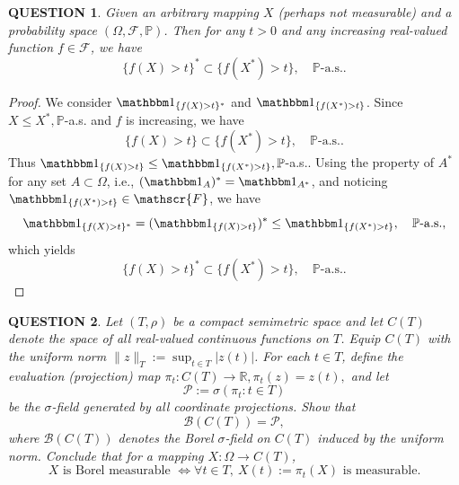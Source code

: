 \documentclass[12pt]{article}
\renewcommand{\(}{\left(}%
\renewcommand{\)}{\right)}%
\renewcommand{\[}{\left[}%
\renewcommand{\]}{\right]}%
\newcommand{\p}{\mathbb{P}}
\newcommand{\f}{\mathscr{F}}
\newtheorem{question}{QUESTION}[section]}
\newtheorem{proof}{Proof.}}
\begin{document}
\begin{question}
	Given an arbitrary mapping $X$ (perhaps not measurable) and a probability space $(\Omega,\f,\p)$. Then for any $t>0$ and any increasing real-valued function $f\in\f$, we have
	\begin{equation*}
		\{f(X)>t\}^*\subset \{f(X^*)>t\},\quad \p\text{-}\mathrm{a.s.}.
	\end{equation*}
\end{question}
\begin{proof}
	We consider $\mathbbm 1_{\{f(X)>t\}^*}$ and $\mathbbm 1_{\{f(X^*)>t\}}$. Since $X\leq X^*,\p$-a.s. and $f$ is increasing, we have 
	\begin{equation*}
		\{f(X)>t\}\subset \{f(X^*)>t\},\quad \p\text{-}\mathrm{a.s.}.
	\end{equation*}
	Thus $\mathbbm 1_{\{f(X)>t\}}\leq \mathbbm 1_{\{f(X^*)>t\}},\p$-a.s.. Using the property of $A^*$ for any set $A\subset \Omega$, i.e., $(\mathbbm 1_A)^*=\mathbbm 1_{A^*}$, and noticing $\mathbbm 1_{\{f(X^*)>t\}}\in\f$, we have
	\begin{equation*}
		\mathbbm 1_{\{f(X)>t\}^*}=(\mathbbm 1_{\{f(X)>t\}})^*\leq \mathbbm 1_{\{f(X^*)>t\}},\quad \p\text{-}\mathrm{a.s.},
	\end{equation*}
	which yields 
	\begin{equation*}
		\{f(X)>t\}^*\subset \{f(X^*)>t\},\quad \p\text{-}\mathrm{a.s.}.
	\end{equation*}
\end{proof}

\begin{question}
Let $(T,\rho)$ be a compact semimetric space and let $C(T)$ denote the space of all real-valued continuous functions on $T$. Equip $C(T)$ with the uniform norm $\|z\|_T := \sup_{t\in T} |z(t)|$.
For each $t\in T$, define the evaluation (projection) map $\pi_t : C(T) \to \mathbb R, \pi_t(z) = z(t),$
and let
\begin{equation*}
\mathcal P := \sigma(\pi_t : t\in T)
\end{equation*}
be the $\sigma$-field generated by all coordinate projections. Show that
\begin{equation*}
\mathcal B(C(T)) = \mathcal P,
\end{equation*}
where $\mathcal B(C(T))$ denotes the Borel $\sigma$-field on $C(T)$ induced by the uniform norm. Conclude that for a mapping $X:\Omega\to C(T)$,
\begin{equation*}
X \text{ is Borel measurable } \iff \forall t\in T,\ X(t):=\pi_t(X) \text{ is measurable}.
\end{equation*}
\end{question}
\end{document}
